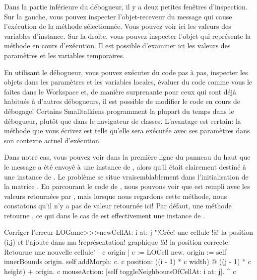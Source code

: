 \documentclass[a4paper,10pt,twoside]{book}
\begin{document}
Dans la partie inférieure du débogueur, il y a deux petites fenêtres
d'inspection. Sur la gauche, vous pouvez inspecter l'objet-receveur du 
message qui cause l'exécution de la méthode sélectionnée. Vous pouvez 
voir ici les valeurs des variables d'instance.
Sur la droite, vous pouvez inspecter l'objet qui représente la méthode 
en cours d'exécution. Il est possible d'examiner ici les valeurs des 
paramètres et les variables temporaires.

En utilisant le débogueur, vous pouvez exécuter du code pas à pas,
inspecter les objets dans les paramètres et les variables locales,
évaluer du code comme vous le faites dans le Workspace et, de manière
surprenante pour ceux qui sont déjà habitués à d'autres débogueurs, il
est possible de modifier le code en cours de débogage! 
Certains Smalltalkiens programment la plupart du temps dans le
débogueur, plutôt que dans le navigateur de classes.
L'avantage est certain: la méthode que vous écrivez est telle
qu'elle sera exécutée \ie avec ses paramètres dans son contexte
actuel d'exécution.

Dans notre cas, vous pouvez voir dans la première ligne du panneau du 
haut que le message  a été envoyé à une instance de , 
alors qu'il était clairement destiné à une instance de .
Le problème se situe vraisemblablement dans l'initialisation de la matrice .
En parcourant le code de , nous pouvons
voir que  est rempli avec les valeurs retournées par
, mais lorsque nous regardons cette méthode, nous
constatons qu'il n'y a pas de valeur retournée ici!
Par défaut, une méthode retourne , ce qui dans le cas 
de  est effectivement une instance de .


\begin{method}{Corriger l'erreur}
LOGame>>>newCellAt: i at: j
    "!Crée! une cellule !à! la position (i,j) et l'ajoute dans ma !représentation! graphique !à! la position correcte. Retourne une nouvelle cellule"
   | c origin |
   c := LOCell new.
   origin := self innerBounds origin.
   self addMorph: c.
   c position: ((i - 1) * c width) @ ((j - 1) * c height) + origin.
   c mouseAction: [self toggleNeighboursOfCellAt: i at: j].
   ^ c
\end{method}
\end{document}
